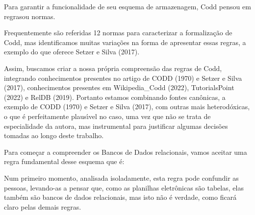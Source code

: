 \documentclass[
12pt,		%
openright,	%
twoside,  %
a4paper,			%
chapter=TITLE,		%
english,			%
french,				%
spanish,			%
brazil				%
]{USPSC-classe/USPSC}
\begin{document}
Para garantir a funcionalidade de seu esquema de armazenagem, Codd pensou em \textquotedbl regras\textquotedbl  ou normas.










Frequentemente s\~ao referidas 12 normas para caracterizar a formaliza\c{c}\~ao de Codd, mas identificamos muitas varia\c{c}\~oes na forma de apresentar essas regras, a exemplo do que oferece Setzer e Silva (2017).










Assim, buscamos criar a nossa pr\'opria compreens\~ao das regras de Codd, integrando conhecimentos presentes no artigo de  CODD (1970) e  Setzer e Silva (2017), conhecimentos presentes em Wikipedia\_Codd (2022),  TutorialsPoint (2022) e  RelDB (2019). Portanto estamos combinando fontes can\^onicas, a exemplo de  CODD (1970) e Setzer e Silva (2017), com outras mais heterod\'oxicas, o que \'e perfeitamente plaus\'{\i}vel no caso, uma vez que n\~ao se trata de especialidade da autora, mas instrumental para justificar algumas decis\~oes tomadas ao longo deste trabalho.










Para come\c{c}ar a compreender os Bancos de Dados relacionais, vamos aceitar uma regra fundamental desse esquema que \'e:











\noindent\begin{center}\mbox{\centering{}}\end{center}


Num primeiro momento, analisada isoladamente, esta regra pode confundir as pessoas, levando-as a pensar que, como as planilhas eletr\^onicas s\~ao tabelas, elas tamb\'em s\~ao bancos de dados relacionais, mas isto n\~ao \'e verdade, como ficar\'a claro pelas demais regras.
\end{document}
